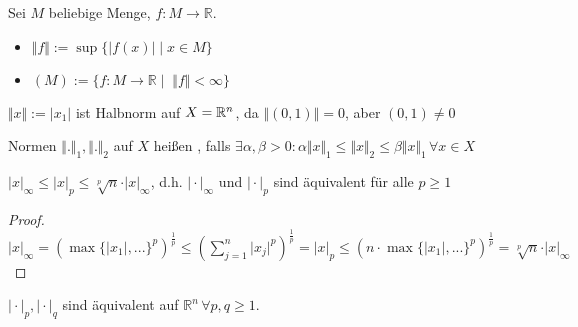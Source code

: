\begin{example}
	Sei $M$ beliebige Menge, $f:M\rightarrow \mathbb{R}$.
	\begin{itemize}
		\item $\Vert f \Vert :=\sup\{ \vert f(x)\vert \mid x\in M\}$ 
		\item {}$(M):=\{ f:M\rightarrow \mathbb{R} \mid\; \Vert f \Vert < \infty \}$ 
	\end{itemize}
\end{example}

\begin{example}
	$\Vert x\Vert:=\vert x_1\vert$ ist Halbnorm auf $X=\mathbb{R}^n$, da $\Vert(0,1)\Vert=0$, aber $(0,1)\neq 0$
\end{example}

\begin{definition}
	Normen $\Vert .\Vert_1, \Vert .\Vert_2$ auf $X$ heißen , falls $\exists \alpha,\beta > 0:\alpha \Vert x \Vert_1 \le \Vert x\Vert_2 \le \beta \Vert x\Vert_1 \,\forall x\in X$
\end{definition}

\begin{example}
	$\vert x \vert_\infty \le \vert x\vert_p \le \sqrt[p]{n}\cdot\vert x\vert_\infty$, d.h. $\vert\cdot\vert_\infty$ und $\vert\cdot\vert_p$ sind äquivalent für alle $p\ge 1$
\end{example}
\begin{proof}
	$\vert x\vert_\infty=(\max\{\vert x_1\vert,...\}^p)^{\frac{1}{p}}\le \left(\sum_{j=1}^n \vert x_j\vert^p \right)^{\frac{1}{p}}=\vert x\vert_p\le (n\cdot\max\{\vert x_1\vert,...\}^p)^{\frac{1}{p}}=\sqrt[p]{n}\cdot \vert x\vert_\infty$
\end{proof}

\begin{conclusion}
	$\vert\cdot\vert_p, \vert\cdot\vert_q$ sind äquivalent auf $\mathbb{R}^n\,\forall p,q\ge 1$.
\end{conclusion}


